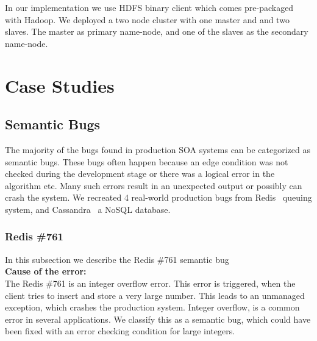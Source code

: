 In our implementation we use HDFS binary client which comes pre-packaged with Hadoop.
We deployed a two node cluster with one master and and two slaves.
The master as primary name-node, and one of the slaves as the secondary name-node.

\section{Case Studies}
\label{sec:parikshanCasestudy}




\subsection{Semantic Bugs}
The majority of the bugs found in production SOA systems can be categorized as semantic bugs.
These bugs often happen because an edge condition was not checked during the development stage or there was a logical error in the algorithm etc.
Many such errors result in an unexpected output or possibly can crash the system.
We recreated 4 real-world production bugs from Redis~\cite{redis} queuing system, and Cassandra~\cite{cassandra} a NoSQL database.


\subsubsection{Redis \#761}

In this subsection we describe the Redis \#761 semantic bug \\

\noindent \textbf{Cause of the error:}\\


\noindent The Redis \#761 is an integer overflow error. 
This error is triggered, when the client tries to insert and store a very large number. 
This leads to an unmanaged exception, which crashes the production system. 
Integer overflow, is a common error in several applications. 
We classify this as a semantic bug, which could have been fixed with an error checking condition for large integers. \\


